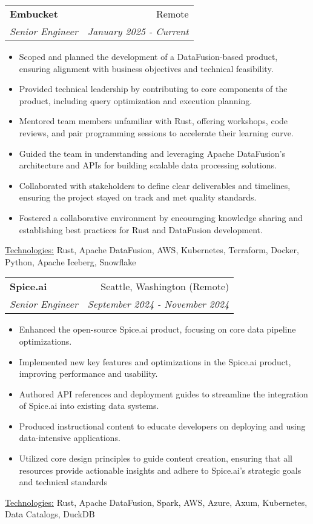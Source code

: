 \documentclass[letterpaper,11pt]{article}
\makeatletter
\newcommand{\resumeItem}[1]{%
  \item\small{
    #1
  }
}
\newcommand{\resumeSubheading}[4]{
  \vspace{8pt}\item%
    \begin{tabular*}{0.97\textwidth}[t]{l@{\extracolsep{\fill}}r}
      \textbf{#1} & #2 \\
      \textit{\small#3} & \textit{\small #4} \\
    \end{tabular*}\vspace{-5pt}
}
\newcommand{\resumeItemListStart}{\begin{itemize}}
\newcommand{\resumeItemListEnd}{\end{itemize}\vspace{-5pt}}
\newcommand{\resumeTech}[2]{
 \underline{#1:} #2
}
\makeatother
\begin{document}
  \resumeSubheading
      {Embucket}{Remote}
      {Senior Engineer}{January 2025 - Current}
      \resumeItemListStart
      \resumeItem{Scoped and planned the development of a DataFusion-based product, ensuring alignment with business objectives and technical feasibility.}
      \resumeItem{Provided technical leadership by contributing to core components of the product, including query optimization and execution planning.}
      \resumeItem{Mentored team members unfamiliar with Rust, offering workshops, code reviews, and pair programming sessions to accelerate their learning curve.}
      \resumeItem{Guided the team in understanding and leveraging Apache DataFusion's architecture and APIs for building scalable data processing solutions.}
      \resumeItem{Collaborated with stakeholders to define clear deliverables and timelines, ensuring the project stayed on track and met quality standards.}
      \resumeItem{Fostered a collaborative environment by encouraging knowledge sharing and establishing best practices for Rust and DataFusion development.}
      \resumeItemListEnd
      \resumeTech{Technologies}{Rust, Apache DataFusion, AWS, Kubernetes, Terraform, Docker, Python, Apache Iceberg, Snowflake}\\

      \resumeSubheading
      {Spice.ai}{Seattle, Washington (Remote)}
      {Senior Engineer}{September 2024 - November 2024}
      \resumeItemListStart
      \resumeItem{Enhanced the open-source Spice.ai product, focusing on core data pipeline optimizations.}
      \resumeItem{Implemented new key features and optimizations in the Spice.ai product, improving performance and usability.}
      \resumeItem{Authored API references and deployment guides to streamline the integration of Spice.ai into existing data systems.}
      \resumeItem{Produced instructional content to educate developers on deploying and using data-intensive applications.}
      \resumeItem{Utilized core design principles to guide content creation, ensuring that all resources provide actionable insights and adhere to Spice.ai's strategic goals and technical standards}
      \resumeItemListEnd
      \resumeTech{Technologies}{Rust, Apache DataFusion, Spark, AWS, Azure, Axum, Kubernetes, Data Catalogs, DuckDB}\\
\end{document}
